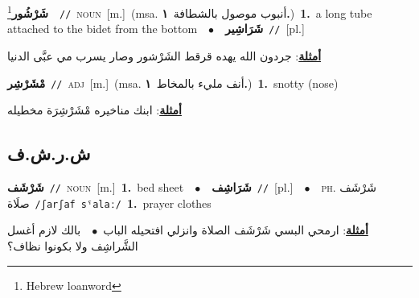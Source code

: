 \documentclass[10pt,a4paper,twoside]{article} %
\begin{document}
\begin{multicols}{2}
{\setlength\topsep{0pt}\textbf{\foreignlanguage{arabic}{شَرْشُور}}\footnote{Hebrew loanword}\ \ {\color{gray}\texttt{//}\color{black}}\ \textsc{noun}\ [m.]\ \color{gray}(msa. \foreignlanguage{arabic}{أنبوب موصول بالشطافة}~\foreignlanguage{arabic}{\textbf{١.}})\color{black}\ \textbf{1.}~a long tube attached to the bidet from the bottom\ \ $\bullet$\ \ \setlength\topsep{0pt}\textbf{\foreignlanguage{arabic}{شَرَاشِير}}\ {\color{gray}\texttt{//}\color{black}}\ [pl.]\  \begin{flushright}\color{gray}\foreignlanguage{arabic}{\textbf{\underline{\foreignlanguage{arabic}{أمثلة}}}: جردون الله يهده قرقط الشَرْشور وصار يسرب مي عبَّى الدنيا}\end{flushright}\color{black}} \vspace{2mm}

{\setlength\topsep{0pt}\textbf{\foreignlanguage{arabic}{مْشَرْشِر}}\ {\color{gray}\texttt{//}\color{black}}\ \textsc{adj}\ [m.]\ \color{gray}(msa. \foreignlanguage{arabic}{أنف مليء بالمخاط}~\foreignlanguage{arabic}{\textbf{١.}})\color{black}\ \textbf{1.}~snotty (nose)\  \begin{flushright}\color{gray}\foreignlanguage{arabic}{\textbf{\underline{\foreignlanguage{arabic}{أمثلة}}}: ابنك مناخيره مْشَرْشِرَة مخطيله}\end{flushright}\color{black}} \vspace{2mm}

\vspace{-3mm}
\subsection*{\color{blue}\foreignlanguage{arabic}{ش.ر.ش.ف}\color{blue}{}} 

{\setlength\topsep{0pt}\textbf{\foreignlanguage{arabic}{شَرْشَف}}\ {\color{gray}\texttt{//}\color{black}}\ \textsc{noun}\ [m.]\ \textbf{1.}~bed sheet\ \ $\bullet$\ \ \setlength\topsep{0pt}\textbf{\foreignlanguage{arabic}{شَرَاشِف}}\ {\color{gray}\texttt{//}\color{black}}\ [pl.]\ \ $\bullet$\ \ \textsc{ph.} \color{gray} \foreignlanguage{arabic}{شَرْشَف صلَاة}\color{black}\ {\color{gray}\texttt{/{\sffamily ʃarʃaf sˤalaː}/}\color{black}}\ \textbf{1.}~prayer clothes\  \begin{flushright}\color{gray}\foreignlanguage{arabic}{\textbf{\underline{\foreignlanguage{arabic}{أمثلة}}}: ارمحي البسي شَرْشَف الصلاة وانزلي افتحيله الباب\ $\bullet$\ \  بالك لازم أغسل الشَّراشِف ولا بكونوا نظاف؟}\end{flushright}\color{black}} \vspace{2mm}


\end{multicols}
\end{document}

